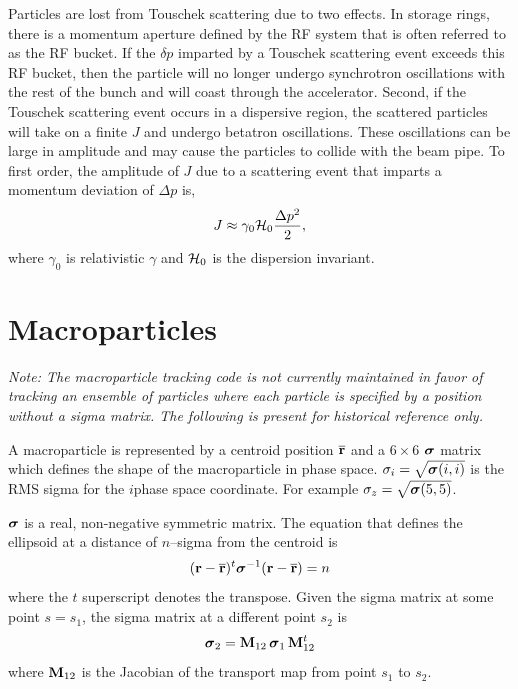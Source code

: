 Particles are lost from Touschek scattering due to two effects.  In storage rings, there is a
momentum aperture defined by the RF system that is often referred to as the RF bucket.  If the
$\delta p$ imparted by a Touschek scattering event exceeds this RF bucket, then the particle will no
longer undergo synchrotron oscillations with the rest of the bunch and will coast through the
accelerator.  Second, if the Touschek scattering event occurs in a dispersive region, the scattered
particles will take on a finite $J$ and undergo betatron oscillations.  These oscillations can be
large in amplitude and may cause the particles to collide with the beam pipe.  To first order, the
amplitude of $J$ due to a scattering event that imparts a momentum deviation of $\Delta p$ is,
\begin{equation}
  J\approx\gamma_0{\cal H}_0\frac{\Delta p^2}{2},
\end{equation}
where $\gamma_0$ is relativistic $\gamma$ and ${\cal H}_0$ is the dispersion invariant.

\section{Macroparticles}
\label{s:macro}

{\em Note: The macroparticle tracking code is not currently maintained in favor of tracking an
ensemble of particles where each particle is specified by a position without a sigma matrix. The
following is present for historical reference only.}

A macroparticle\cite{b:transport.appendix} is represented by a centroid position $\overline{{\bf r}}$ and a $6
\times 6$ ${\boldsymbol{\sigma}}$ matrix which defines the shape of the macroparticle in phase space. $\sigma_i =
\sqrt{{\boldsymbol{\sigma}}(i,i)}$ is the RMS sigma for the $i$\Th phase space coordinate. For example $\sigma_z =
\sqrt{{\boldsymbol{\sigma}}(5,5)}$.

${\boldsymbol{\sigma}}$ is a real, non-negative symmetric matrix. The equation that defines the ellipsoid at a
distance of $n$--sigma from the centroid is
\begin{equation}
  ({\bf r} - \overline{{\bf r}})^t {\boldsymbol{\sigma}}^{-1} ({\bf r} - \overline{{\bf r}}) = n
\end{equation}
where the $t$ superscript denotes the transpose. Given the sigma matrix at some point $s = s_1$, the
sigma matrix at a different point $s_2$ is
\begin{equation}
  {\boldsymbol{\sigma}}_2 = {\bf M}_{12} \, {\boldsymbol{\sigma}}_1 \, {\bf M}_{12}^t
\end{equation}
where ${\bf M}_{12}$ is the Jacobian of the transport map from point
$s_1$ to $s_2$.

